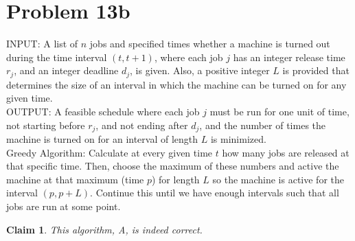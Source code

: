 \documentclass{article}
\newtheorem{thm}{Claim}
\providecommand{\prob}[1]{\section*{Problem #1}}
\begin{document}
	\prob{13b}
	INPUT: A list of $n$ jobs and specified times whether a machine is turned out during the time interval $(t, t + 1)$, where each job $j$ has an integer release time $r_j$, and an integer deadline $d_j$, is given. Also, a positive integer $L$ is provided that determines the size of an interval in which the machine can be turned on for any given time.\\
	OUTPUT: A feasible schedule where each job $j$ must be run for one unit of time, not starting before $r_j$, and not ending after $d_j$, and the number of times the machine is turned on for an interval of length $L$ is minimized. \\

	Greedy Algorithm: Calculate at every given time $t$ how many jobs are released at that specific time.  Then, choose the maximum of these numbers and active the machine at that maximum (time $p$) for length $L$ so the machine is active for the interval $(p, p+L)$.  Continue this until we have enough intervals such that all jobs are run at some point.

	\begin{thm}
		This algorithm, A, is indeed correct.
	\end{thm}
\end{document}
